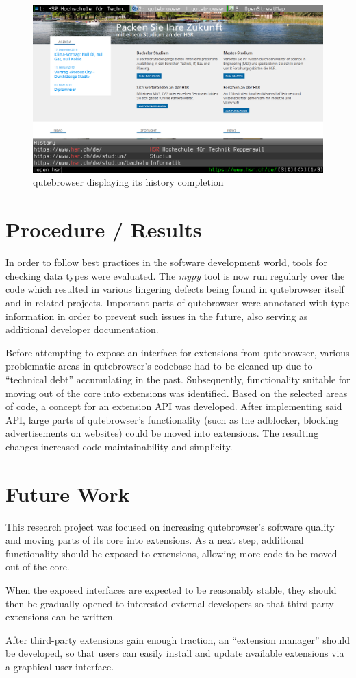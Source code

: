 \begin{figure}[H]
\includegraphics[width=\linewidth]{img/screenshot-intro.png}
\caption{qutebrowser displaying its history completion}
\end{figure}

\section*{Procedure / Results}
In order to follow best practices in the software development world,
tools for checking data types were evaluated. The \emph{mypy} tool is now run
regularly over the code which resulted in various lingering defects
being found in qutebrowser itself and in related projects. Important parts of
qutebrowser were annotated with type information in order to prevent such issues
in the future, also serving as additional developer documentation.

Before attempting to expose an interface for extensions from qutebrowser,
various problematic areas in qutebrowser's codebase had to be cleaned up due to
``technical debt'' accumulating in the past. Subsequently, functionality
suitable for moving out of the core into extensions was identified. Based on
the selected areas of code, a concept for an extension API was developed. After
implementing said API, large parts of qutebrowser's functionality (such as the
adblocker, blocking advertisements on websites) could be moved into extensions.
The resulting changes increased code maintainability and simplicity.

\section*{Future Work}
This research project was focused on increasing qutebrowser's software quality
and moving parts of its core into extensions. As a next step, additional
functionality should be exposed to extensions, allowing more code to be moved
out of the core.

When the exposed interfaces are expected to be reasonably stable,
they should then be gradually opened to interested external developers so that
third-party extensions can be written.

After third-party extensions gain enough traction, an ``extension manager''
should be developed, so that users can easily install and update available
extensions via a graphical user interface.